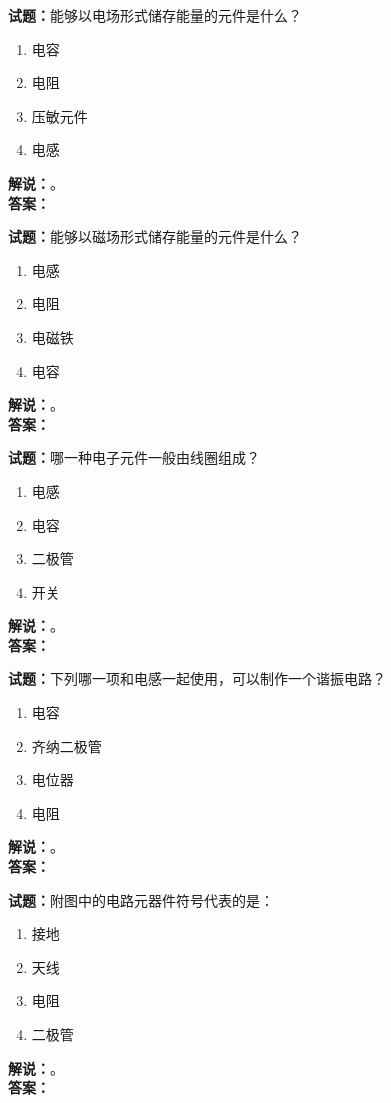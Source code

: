 \documentclass{ctexbook}
\begin{document}
\bigskip

\noindent\textbf{试题：}能够以电场形式储存能量的元件是什么？
\begin{enumerate}[leftmargin=3em]
  \item 电容
  \item 电阻
  \item 压敏元件
  \item 电感
\end{enumerate}
\noindent\textbf{解说：}\textbf{}。\\\noindent\textbf{答案：}

\bigskip

\noindent\textbf{试题：}能够以磁场形式储存能量的元件是什么？
\begin{enumerate}[leftmargin=3em]
  \item 电感
  \item 电阻
  \item 电磁铁
  \item 电容
\end{enumerate}
\noindent\textbf{解说：}\textbf{}。\\\noindent\textbf{答案：}

\bigskip

\noindent\textbf{试题：}哪一种电子元件一般由线圈组成？
\begin{enumerate}[leftmargin=3em]
  \item 电感
  \item 电容
  \item 二极管
  \item 开关
\end{enumerate}
\noindent\textbf{解说：}\textbf{}。\\\noindent\textbf{答案：}

\bigskip

\noindent\textbf{试题：}下列哪一项和电感一起使用，可以制作一个谐振电路？
\begin{enumerate}[leftmargin=3em]
  \item 电容
  \item 齐纳二极管
  \item 电位器
  \item 电阻
\end{enumerate}
\noindent\textbf{解说：}\textbf{}。\\\noindent\textbf{答案：}

\bigskip

\noindent\textbf{试题：}附图中的电路元器件符号代表的是：
\begin{enumerate}[leftmargin=3em]
  \item 接地
  \item 天线
  \item 电阻
  \item 二极管
\end{enumerate}
\noindent\textbf{解说：}\textbf{}。\\\noindent\textbf{答案：}
\end{document}
